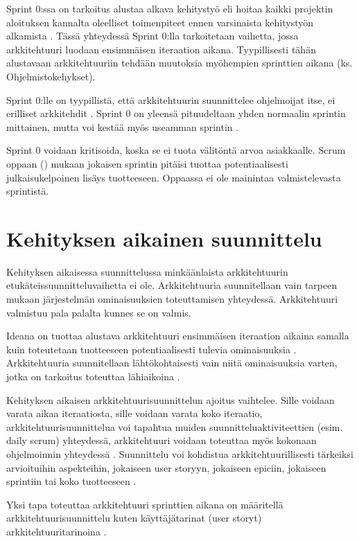 Sprint 0:ssa on tarkoitus alustaa alkava kehitystyö eli hoitaa kaikki projektin aloituksen kannalta oleelliset toimenpiteet ennen varsinaista kehitystyön alkamista \citep{levison_what_2008}. Tässä yhteydessä Sprint 0:lla tarkoitetaan vaihetta, jossa arkkitehtuuri luodaan ensimmäisen iteraation aikana. Tyypillisesti tähän alustavaan arkkitehtuuriin tehdään muutoksia myöhempien sprinttien aikana (ks. Ohjelmistokehykset). 

Sprint 0:lle on tyypillistä, että arkkitehtuurin suunnittelee ohjelmoijat itse, ei erilliset arkkitehdit \citep{eloranta2015techniques}. Sprint 0 on yleensä pituudeltaan yhden normaalin sprintin mittainen, mutta voi kestää myös useamman sprintin \citep{prause_architectural_2012}.

Sprint 0 voidaan kritisoida, koska se ei tuota välitöntä arvoa asiakkaalle.
Scrum oppaan (\citeyear{sutherland_scrum_2020}) mukaan jokaisen sprintin pitäisi tuottaa potentiaalisesti julkaisukelpoinen lisäys tuotteeseen. Oppaassa ei ole mainintaa valmistelevasta sprintistä.

\section{Kehityksen aikainen suunnittelu}
Kehityksen aikaisessa suunnittelussa minkäänlaista arkkitehtuurin etukäteissuunnitteluvaihetta ei ole. Arkkitehtuuria suunnitellaan vain tarpeen mukaan järjestelmän ominaisuuksien toteuttamisen yhteydessä. Arkkitehtuuri valmistuu pala palalta kunnes se on valmis.

Ideana on tuottaa alustava arkkitehtuuri ensimmäisen iteraation aikaina samalla kuin toteutetaan tuotteeseen potentiaalisesti tulevia ominaisuuksia \citep{eloranta2015techniques}. Arkkitehtuuria suunnitellaan lähtökohtaisesti vain niitä ominaisuuksia varten, jotka on tarkoitus toteuttaa lähiaikoina \citep{waterman_how_2015}. 

Kehityksen aikaisen arkkitehtuurisuunnittelun ajoitus vaihtelee.
Sille voidaan varata aikaa iteraatiosta, sille voidaan varata koko iteraatio, arkkitehtuurisuunnittelua voi tapahtua muiden suunnitteluaktiviteettien (esim. daily scrum) yhteydessä, arkkitehtuuri voidaan toteuttaa myös kokonaan ohjelmoinnin yhteydessä \citep{rost_distilling_2015}. Suunnittelu voi kohdistua arkkitehtuurillisesti tärkeiksi arvioituihin aspekteihin, jokaiseen user storyyn, jokaiseen epiciin, jokaiseen sprintiin tai koko tuotteeseen \citep{rost_distilling_2015}.


Yksi tapa toteuttaa arkkitehtuuri sprinttien aikana on määritellä arkkitehtuurisuunnittelu kuten käyttäjätarinat (user storyt) arkkitehtuuritarinoina \citep{jensen2006architecture}.


